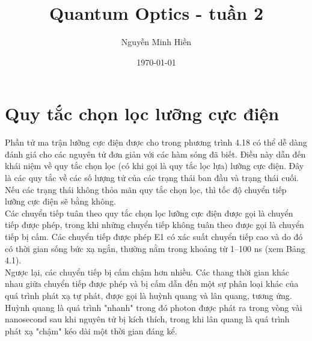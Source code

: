 \documentclass{article}
\title{Quantum Optics - tuần 2}
\author{Nguyễn Minh Hiền}
\date{\today}
\begin{document}
	\maketitle
\section*{Quy tắc chọn lọc lưỡng cực điện}
Phần tử ma trận lưỡng cực điện được cho trong phương trình 4.18 có thể dễ dàng đánh giá cho các nguyên tử đơn giản với các hàm sóng đã biết. Điều này dẫn đến khái niệm về quy tắc chọn lọc (có khi gọi là quy tắc lọc lựa) lưỡng cực điện. Đây là các quy tắc về các số lượng tử của các trạng thái ban đầu và trạng thái cuối. Nếu các trạng thái không thỏa mãn quy tắc chọn lọc, thì tốc độ chuyển tiếp lưỡng cực điện sẽ bằng không.\\

Các chuyển tiếp tuân theo quy tắc chọn lọc lưỡng cực điện được gọi là chuyển tiếp được phép, trong khi những chuyển tiếp không tuân theo được gọi là chuyển tiếp bị cấm. Các chuyển tiếp được phép E1 có xác suất chuyển tiếp cao và do đó có thời gian sống bức xạ ngắn, thường nằm trong khoảng từ 1–100 ns (xem Bảng 4.1).\\ Ngược lại, các chuyển tiếp bị cấm chậm hơn nhiều. Các thang thời gian khác nhau giữa chuyển tiếp được phép và bị cấm dẫn đến một sự phân loại khác của quá trình phát xạ tự phát, được gọi là huỳnh quang và lân quang, tương ứng. Huỳnh quang là quá trình "nhanh" trong đó photon được phát ra trong vòng vài nanosecond sau khi nguyên tử bị kích thích, trong khi lân quang là quá trình phát xạ "chậm" kéo dài một thời gian đáng kể.\\
\end{document}
